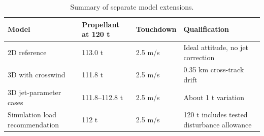 \begin{table}[htbp]
\caption{Summary of separate model extensions.}
\label{tab:src13}
\small
\setlength{\tabcolsep}{3.5pt}
\begin{tabularx}{\linewidth}{@{}XXXX@{}}
\toprule
Model & Propellant at 120 t & Touchdown & Qualification \\
\midrule
2D reference & 113.0 t & 2.5 m/s & Ideal attitude, no jet correction \\
3D with crosswind & 111.8 t & 2.5 m/s & 0.35 km cross-track drift \\
3D jet-parameter cases & 111.8--112.8 t & 2.5 m/s & About 1 t variation \\
Simulation load recommendation & 112 t & 2.5 m/s & 120 t includes tested disturbance allowance \\
\bottomrule
\end{tabularx}
\end{table}
